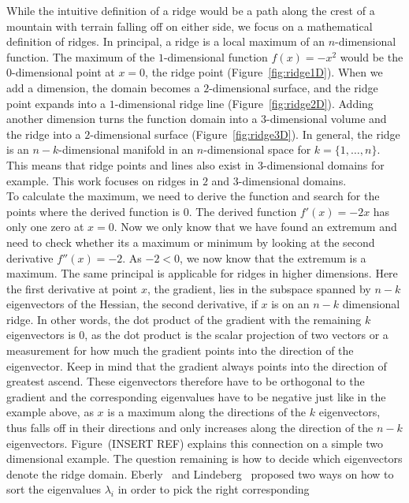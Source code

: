 While the intuitive definition of a ridge would be a path along the
crest of a mountain with terrain falling off on either side, we focus on
a mathematical definition of ridges. In principal, a ridge is a local
maximum of an $n$-dimensional function. The maximum of the
$1$-dimensional function $f(x) = -x^2$ would be the $0$-dimensional
point at $x=0$, the ridge point (Figure~\ref{fig:ridge1D}). When we add
a dimension, the domain becomes a $2$-dimensional surface, and the ridge
point expands into a $1$-dimensional ridge line
(Figure~\ref{fig:ridge2D}). Adding another dimension turns the function
domain into a $3$-dimensional volume and the ridge into a
$2$-dimensional surface (Figure~\ref{fig:ridge3D}). In general, the
ridge is an $n-k$-dimensional manifold in an $n$-dimensional space for
$k=\{1, \dots, n\}$. This means that ridge points and lines also exist
in $3$-dimensional domains for example. This work focuses on ridges in
$2$ and $3$-dimensional domains.\\
To calculate the maximum, we need to derive the function and search for
the points where the derived function is $0$. The derived function
$f'(x)=-2x$ has only one zero at $x=0$. Now we only know that we have
found an extremum and need to check whether its a maximum or minimum by
looking at the second derivative $f''(x)=-2$. As $-2 < 0$, we now know
that the extremum is a maximum. The same principal is applicable for
ridges in higher dimensions. Here the first derivative at point $x$, the
gradient, lies in the subspace spanned by $n-k$ eigenvectors of the
Hessian, the second derivative, if $x$ is on an $n-k$ dimensional ridge.
In other words, the dot product of the gradient with the remaining $k$
eigenvectors is $0$, as the dot product is the scalar projection of two
vectors or a measurement for how much the gradient points into the
direction of the eigenvector. Keep in mind that the gradient always
points into the direction of greatest ascend. These eigenvectors
therefore have to be orthogonal to the gradient and the corresponding
eigenvalues have to be negative just like in the example above, as $x$
is a maximum along the directions of the $k$ eigenvectors, thus falls
off in their directions and only increases along the direction of the
$n-k$ eigenvectors. Figure~(INSERT REF) explains this connection on a
simple two dimensional example. The question remaining is how to decide
which eigenvectors denote the ridge domain. Eberly~\cite{Eberly} and
Lindeberg~\cite{Lindeberg} proposed two ways on how to sort the
eigenvalues $\lambda_i$ in order to pick the right corresponding
